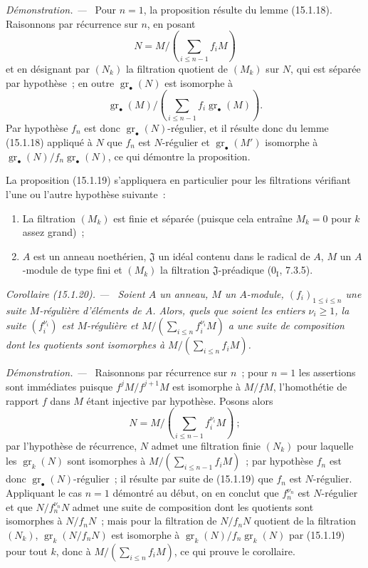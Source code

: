 \documentclass[10pt,oneside]{book}
\makeatletter
\newcommand{\gr}{\operatorname{gr}}
\newcommand{\setmanualcurrentlabel}[1]{\def\@currentlabel{#1}}
\newcommand{\oldpage}[2][]{%
  \setcounter{footnote}{0}%
  \marginpar{\scriptsize\textbf{#1}~|~#2}\ignorespaces}
\newenvironment{corollary}[1][]{%
  \setmanualcurrentlabel{#1}\par\medskip\noindent\itshape Corollaire (#1). ---\ }{\par}
\newenvironment{proof}{%
  \par\medskip\noindent\textit{Démonstration. ---\ }}{\par}
\makeatother
\begin{document}
\begin{proof}
Pour $n=1$, la proposition résulte du lemme (15.1.18). Raisonnons par
récurrence sur $n$, en posant
\[
  N=M/\left(\sum_{i\leq n-1}f_iM\right)
\]
et en désignant par $(N_k)$ la filtration quotient de $(M_k)$ sur $N$, qui
est séparée par hypothèse~; en outre $\gr_\bullet(N)$ est isomorphe à
\[
  \gr_\bullet(M)/
  \left(\sum_{i\leq n-1}f_i\gr_\bullet(M)\right).
\]
Par hypothèse $f_n$ est donc $\gr_\bullet(N)$-régulier, et il résulte donc du
lemme (15.1.18) appliqué à $N$ que $f_n$ est $N$-régulier et
$\gr_\bullet(M')$ isomorphe à
$\gr_\bullet(N)/f_n\gr_\bullet(N)$, ce qui démontre la proposition.
\end{proof}

La proposition (15.1.19) s'appliquera en particulier pour les filtrations
vérifiant l'une ou l'autre hypothèse suivante~:
\begin{enumerate}
  \item[$1^\circ$] La filtration $(M_k)$ est finie et séparée (puisque cela
  entraîne $M_k=0$ pour $k$ assez grand)~;
  \item[$2^\circ$] $A$ est un anneau noethérien, $\mathfrak{J}$ un idéal
  contenu dans le radical de $A$, $M$ un $A$-module de type fini et $(M_k)$
  la filtration $\mathfrak{J}$-préadique ($0_{\mathrm I}$, 7.3.5).
\end{enumerate}

\begin{corollary}[15.1.20]
\label{0.15.1.20-fr}
\oldpage[0\textsubscript{IV-1}]{20}
Soient $A$ un anneau, $M$ un $A$-module, $(f_i)_{1\leq i\leq n}$ une suite
$M$-régulière d'éléments de $A$. Alors, quels que soient les entiers
$\nu_i\geq1$, la suite $(f_i^{\nu_i})$ est $M$-régulière et
$M/(\sum_{i\leq n}f_i^{\nu_i}M)$ a une suite de composition dont les
quotients sont isomorphes à $M/(\sum_{i\leq n}f_iM)$.
\end{corollary}

\begin{proof}
Raisonnons par récurrence sur $n$~; pour $n=1$ les assertions sont immédiates
puisque $f^jM/f^{j+1}M$ est isomorphe à $M/fM$, l'homothétie de rapport $f$
dans $M$ étant injective par hypothèse. Posons alors
\[
  N=M/\left(\sum_{i\leq n-1}f_i^{\nu_i}M\right)~;
\]
par l'hypothèse de récurrence, $N$ admet une filtration finie $(N_k)$ pour
laquelle les $\gr_k(N)$ sont isomorphes à
$M/(\sum_{i\leq n-1}f_iM)$~; par hypothèse $f_n$ est donc
$\gr_\bullet(N)$-régulier~; il résulte par suite de (15.1.19) que $f_n$ est
$N$-régulier. Appliquant le cas $n=1$ démontré au début, on en conclut que
$f_n^{\nu_n}$ est $N$-régulier et que $N/f_n^{\nu_n}N$ admet une suite de
composition dont les quotients sont isomorphes à $N/f_nN$~; mais pour la
filtration de $N/f_nN$ quotient de la filtration $(N_k)$,
$\gr_k(N/f_nN)$ est isomorphe à $\gr_k(N)/f_n\gr_k(N)$ par (15.1.19) pour
tout $k$, donc à $M/(\sum_{i\leq n}f_iM)$, ce qui prouve le corollaire.
\end{proof}
\end{document}
